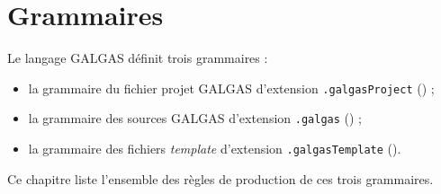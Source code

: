 




\chapter{Grammaires}

Le langage GALGAS définit trois grammaires :
\begin{itemize}
\item la grammaire du fichier projet GALGAS d'extension \texttt{.galgasProject} () ;
\item la grammaire des sources GALGAS d'extension \texttt{.galgas} () ;
\item la grammaire des fichiers \emph{template} d'extension \texttt{.galgasTemplate} ().
\end{itemize}

Ce chapitre liste l'ensemble des règles de production de ces trois grammaires.


